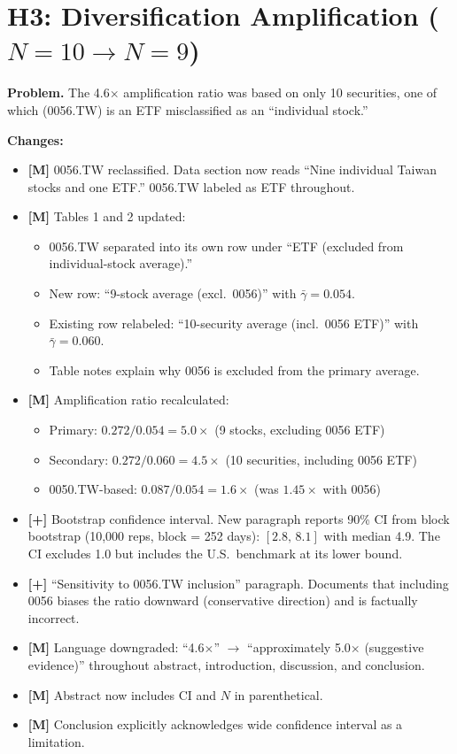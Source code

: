 \documentclass[12pt,a4paper]{article}
\newcommand{\ADD}[1]{\textcolor{addgreen}{\textbf{[+]} #1}}
\newcommand{\MOD}[1]{\textcolor{modblue}{\textbf{[M]} #1}}
\begin{document}
\section{H3: Diversification Amplification ($N = 10 \to N = 9$)}

\textbf{Problem.} The 4.6$\times$ amplification ratio was based on only 10 securities, one of which (0056.TW) is an ETF misclassified as an ``individual stock.''

\textbf{Changes:}
\begin{itemize}
\item \MOD{0056.TW reclassified.} Data section now reads ``Nine individual Taiwan stocks and one ETF.'' 0056.TW labeled as ETF throughout.
\item \MOD{Tables 1 and 2} updated:
  \begin{itemize}
  \item 0056.TW separated into its own row under ``ETF (excluded from individual-stock average).''
  \item New row: ``9-stock average (excl.\ 0056)'' with $\bar{\gamma} = 0.054$.
  \item Existing row relabeled: ``10-security average (incl.\ 0056 ETF)'' with $\bar{\gamma} = 0.060$.
  \item Table notes explain why 0056 is excluded from the primary average.
  \end{itemize}
\item \MOD{Amplification ratio recalculated:}
  \begin{itemize}
  \item Primary: $0.272 / 0.054 = 5.0\times$ (9 stocks, excluding 0056 ETF)
  \item Secondary: $0.272 / 0.060 = 4.5\times$ (10 securities, including 0056 ETF)
  \item 0050.TW-based: $0.087 / 0.054 = 1.6\times$ (was $1.45\times$ with 0056)
  \end{itemize}
\item \ADD{Bootstrap confidence interval.} New paragraph reports 90\% CI from block bootstrap (10,000 reps, block = 252 days): $[2.8, \, 8.1]$ with median 4.9. The CI excludes 1.0 but includes the U.S.\ benchmark at its lower bound.
\item \ADD{``Sensitivity to 0056.TW inclusion'' paragraph.} Documents that including 0056 biases the ratio downward (conservative direction) and is factually incorrect.
\item \MOD{Language downgraded:} ``4.6$\times$'' $\to$ ``approximately 5.0$\times$ (suggestive evidence)'' throughout abstract, introduction, discussion, and conclusion.
\item \MOD{Abstract} now includes CI and $N$ in parenthetical.
\item \MOD{Conclusion} explicitly acknowledges wide confidence interval as a limitation.
\end{itemize}
\end{document}
